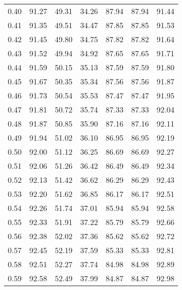 \begin{tabular}{|c|c|c|c|c|c|c|}
      0.40 &     91.27 &     49.31 &      34.26 &   87.94 &      87.94 &         91.44 \\
      0.41 &     91.35 &     49.51 &      34.47 &   87.85 &      87.85 &         91.53 \\
      0.42 &     91.45 &     49.80 &      34.75 &   87.82 &      87.82 &         91.64 \\
      0.43 &     91.52 &     49.94 &      34.92 &   87.65 &      87.65 &         91.71 \\
      0.44 &     91.59 &     50.15 &      35.13 &   87.59 &      87.59 &         91.80 \\
      0.45 &     91.67 &     50.35 &      35.34 &   87.56 &      87.56 &         91.87 \\
      0.46 &     91.73 &     50.54 &      35.53 &   87.47 &      87.47 &         91.95 \\
      0.47 &     91.81 &     50.72 &      35.74 &   87.33 &      87.33 &         92.04 \\
      0.48 &     91.87 &     50.85 &      35.90 &   87.16 &      87.16 &         92.11 \\
      0.49 &     91.94 &     51.02 &      36.10 &   86.95 &      86.95 &         92.19 \\
      0.50 &     92.00 &     51.12 &      36.25 &   86.69 &      86.69 &         92.27 \\
      0.51 &     92.06 &     51.26 &      36.42 &   86.49 &      86.49 &         92.34 \\
      0.52 &     92.13 &     51.42 &      36.62 &   86.29 &      86.29 &         92.43 \\
      0.53 &     92.20 &     51.62 &      36.85 &   86.17 &      86.17 &         92.51 \\
      0.54 &     92.26 &     51.74 &      37.01 &   85.94 &      85.94 &         92.58 \\
      0.55 &     92.33 &     51.91 &      37.22 &   85.79 &      85.79 &         92.66 \\
      0.56 &     92.38 &     52.02 &      37.36 &   85.62 &      85.62 &         92.72 \\
      0.57 &     92.45 &     52.19 &      37.59 &   85.33 &      85.33 &         92.81 \\
      0.58 &     92.51 &     52.27 &      37.74 &   84.98 &      84.98 &         92.89 \\
      0.59 &     92.58 &     52.49 &      37.99 &   84.87 &      84.87 &         92.98 \\

\end{tabular}
